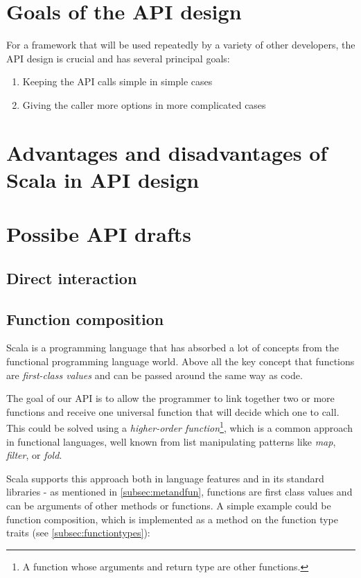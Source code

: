 \section{Goals of the API design}

For a framework that will be used repeatedly by a variety of other developers, the API design is crucial and has several principal goals:

\begin{enumerate}
	\item Keeping the API calls simple in simple cases
	\item Giving the caller more options in more complicated cases
\end{enumerate}

\section{Advantages and disadvantages of Scala in API design}


\section{Possibe API drafts}

\subsection{Direct interaction}

\subsection{Function composition}

Scala is a programming language that has absorbed a lot of concepts from the functional programming language world. Above all the key concept that functions are \textit{first-class values} and can be passed around the same way as code.

The goal of our API is to allow the programmer to link together two or more functions and receive one universal function that will decide which one to call. This could be solved using a \textit{higher-order function}\footnote{A function whose arguments and return type are other functions.}, which is a common approach in functional languages, well known from list manipulating patterns like \textit{map}, \textit{filter}, or \textit{fold}.

Scala supports this approach both in language features and in its standard libraries - as mentioned in \ref{subsec:metandfun}, functions are first class values and can be arguments of other methods or functions. A simple example could be function composition, which is implemented as a method on the function type traits (see \ref{subsec:functiontypes}):

